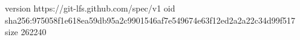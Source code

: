 version https://git-lfs.github.com/spec/v1
oid sha256:975058f1e618ea59db95a2c9901546af7e549674e63f12ed2a2a22c34d99f517
size 262240
